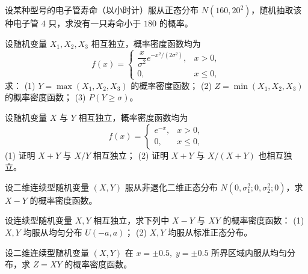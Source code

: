 \begin{homework}[2.59]
设某种型号的电子管寿命（以小时计）服从正态分布 $N(160,20^2)$，随机抽取该种电子管 $4$ 只，求没有一只寿命小于 $180$ 的概率。
\end{homework}

\begin{homework}[2.60]
设随机变量 $X_1,X_2,X_3$ 相互独立，概率密度函数均为
\[
f(x)=
\begin{cases}
\dfrac{x}{\sigma^2} e^{-x^2/(2\sigma^2)}, & x>0, \\
0, & x\le0,
\end{cases}
\]
求：  
(1) $Y=\max(X_1,X_2,X_3)$ 的概率密度函数；  
(2) $Z=\min(X_1,X_2,X_3)$ 的概率密度函数；  
(3) $P(Y\ge\sigma)$。
\end{homework}

\begin{homework}[2.61]
设随机变量 $X$ 与 $Y$ 相互独立，概率密度函数均为
\[
f(x)=
\begin{cases}
e^{-x}, & x>0,\\
0, & x\le0,
\end{cases}
\]
(1) 证明 $X+Y$ 与 $X/Y$ 相互独立；  
(2) 证明 $X+Y$ 与 $X/(X+Y)$ 也相互独立。
\end{homework}

\begin{homework}[2.62]
设二维连续型随机变量 $(X,Y)$ 服从非退化二维正态分布 $N(0,\sigma_1^2;0,\sigma_2^2;0)$，求 $X-Y$ 的概率密度函数。
\end{homework}

\begin{homework}[2.63]
设连续型随机变量 $X,Y$ 相互独立，求下列中 $X-Y$ 与 $XY$ 的概率密度函数：  
(1) $X,Y$ 均服从均匀分布 $U(-a,a)$；  
(2) $X,Y$ 均服从标准正态分布。
\end{homework}

\begin{homework}[2.64]
设二维连续型随机变量 $(X,Y)$ 在 $x=\pm0.5,\; y=\pm0.5$ 所界区域内服从均匀分布，求 $Z=XY$ 的概率密度函数。
\end{homework}
\